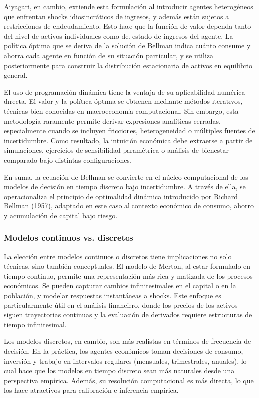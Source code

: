 \documentclass[a4paper,12pt]{article}
\begin{document}
Aiyagari, en cambio, extiende esta formulación al introducir agentes heterogéneos que enfrentan shocks idiosincráticos de ingresos, y además están sujetos a restricciones de endeudamiento. Esto hace que la función de valor dependa tanto del nivel de activos individuales como del estado de ingresos del agente. La política óptima que se deriva de la solución de Bellman indica cuánto consume y ahorra cada agente en función de su situación particular, y se utiliza posteriormente para construir la distribución estacionaria de activos en equilibrio general.

El uso de programación dinámica tiene la ventaja de su aplicabilidad numérica directa. El valor y la política óptima se obtienen mediante métodos iterativos, técnicas bien conocidas en macroeconomía computacional. Sin embargo, esta metodología raramente permite derivar expresiones analíticas cerradas, especialmente cuando se incluyen fricciones, heterogeneidad o múltiples fuentes de incertidumbre. Como resultado, la intuición económica debe extraerse a partir de simulaciones, ejercicios de sensibilidad paramétrica o análisis de bienestar comparado bajo distintas configuraciones.

En suma, la ecuación de Bellman se convierte en el núcleo computacional de los modelos de decisión en tiempo discreto bajo incertidumbre. A través de ella, se operacionaliza el principio de optimalidad dinámica introducido por Richard Bellman (1957), adaptado en este caso al contexto económico de consumo, ahorro y acumulación de capital bajo riesgo. 


\subsubsection{Modelos continuos vs. discretos}

La elección entre modelos continuos o discretos tiene implicaciones no solo técnicas, sino también conceptuales. El modelo de Merton, al estar formulado en tiempo continuo, permite una representación más rica y matizada de los procesos económicos. Se pueden capturar cambios infinitesimales en el capital o en la población, y modelar respuestas instantáneas a shocks. Este enfoque es particularmente útil en el análisis financiero, donde los precios de los activos siguen trayectorias continuas y la evaluación de derivados requiere estructuras de tiempo infinitesimal.

Los modelos discretos, en cambio, son más realistas en términos de frecuencia de decisión. En la práctica, los agentes económicos toman decisiones de consumo, inversión y trabajo en intervalos regulares (mensuales, trimestrales, anuales), lo cual hace que los modelos en tiempo discreto sean más naturales desde una perspectiva empírica. Además, su resolución computacional es más directa, lo que los hace atractivos para calibración e inferencia empírica.
\end{document}
